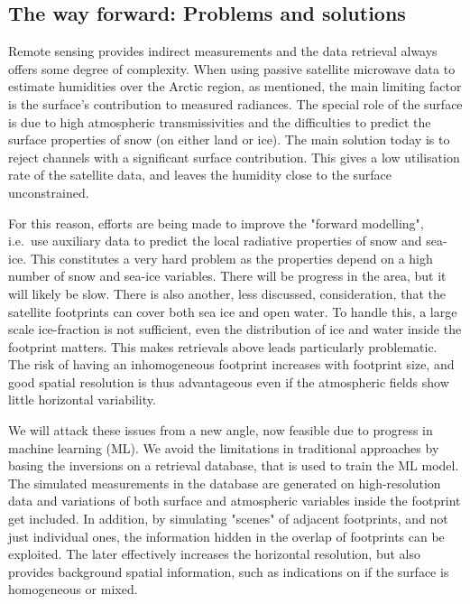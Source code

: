 \documentclass[12pt,oneside,a4paper]{article}
\begin{document}
\subsection{The way forward: Problems and solutions }

Remote sensing provides indirect measurements and the data retrieval always offers some degree of complexity. When using passive satellite microwave data to estimate humidities over the Arctic region, as mentioned, the main limiting factor is the surface's contribution to measured radiances. The special role of the surface is due to high atmospheric transmissivities and the difficulties to predict the surface properties of snow (on either land or ice).
The main solution today is to reject channels with a significant surface
contribution. This gives a low utilisation rate of the satellite data, and
leaves the humidity close to the surface unconstrained.

For this reason, efforts are being made to improve the "forward modelling",
i.e.\ use auxiliary data to predict the local radiative properties of snow and
sea-ice. This constitutes a very hard problem
as the properties depend on a high number of snow and sea-ice
variables. There will be progress in the area, but it will likely be slow.
There is also another, less discussed, consideration, that the satellite
footprints can cover both sea ice and open water. To handle this, a large scale
ice-fraction is not sufficient, even the distribution of ice and water inside
the footprint matters. This makes retrievals above leads particularly
problematic. The risk of having an inhomogeneous footprint increases with
footprint size, and good spatial resolution is thus advantageous even if the atmospheric fields show little horizontal variability.



We will attack these issues from a new angle, now feasible due to progress in
machine learning (ML). We avoid the limitations in traditional approaches by
basing the inversions on a retrieval database, that is used to train the ML
model. The simulated measurements in the database are generated on
high-resolution data and variations of both surface and atmospheric variables
inside the footprint get included. In addition, by simulating "scenes" of
adjacent footprints, and not just individual ones, the information hidden in
the overlap of footprints can be exploited. The later effectively increases the
horizontal resolution, but also provides background spatial information, such
as indications on if the surface is homogeneous or mixed.
\end{document}
